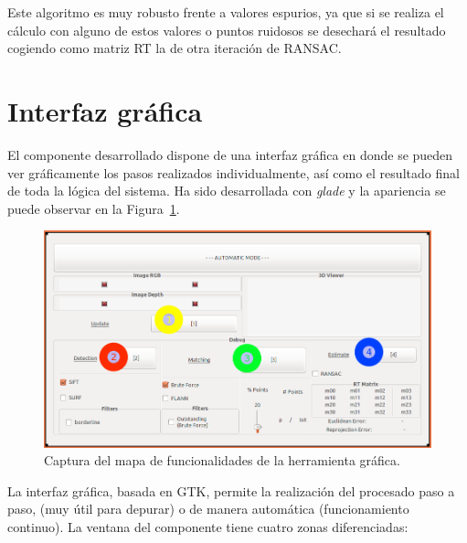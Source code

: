 Este algoritmo es muy robusto frente a valores espurios, ya que si se realiza el cálculo con alguno de estos valores o puntos ruidosos se desechará el resultado cogiendo como matriz RT la de otra iteración de RANSAC.

\section{Interfaz gráfica}

El componente desarrollado dispone de una interfaz gráfica en donde se pueden ver gráficamente los pasos realizados individualmente, así como el resultado final de toda la lógica del sistema. Ha sido desarrollada con \textit{glade} y la apariencia se puede observar en la Figura~\ref{fig:supergui}.

\begin{figure}[th]
\centering
\includegraphics[scale=0.4]{Figures/super_gui.png}
\decoRule
\caption[Captura del mapa de funcionalidades de la herramienta gráfica]{Captura del mapa de funcionalidades de la herramienta gráfica.}
\label{fig:supergui}
\end{figure}

La interfaz gráfica, basada en GTK, permite la realización  del procesado paso a paso, (muy útil para depurar) o de manera automática (funcionamiento continuo). La ventana del componente tiene cuatro zonas diferenciadas: 

